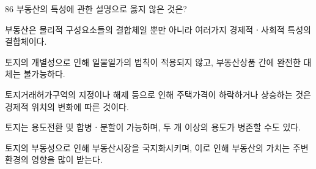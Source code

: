 \begin{question}{86}
부동산의 특성에 관한 설명으로 옳지 않은 것은?
\begin{choices}
  \item 부동산은 물리적 구성요소들의 결합체일 뿐만 아니라 여러가지 경제적ㆍ사회적 특성의 결합체이다.
  \item 토지의 개별성으로 인해 일물일가의 법칙이 적용되지 않고, 부동산상품 간에 완전한 대체는 불가능하다.
  \item 토지거래허가구역의 지정이나 해제 등으로 인해 주택가격이 하락하거나 상승하는 것은 경제적 위치의 변화에 따른 것이다.
  \item 토지는 용도전환 및 합병ㆍ분할이 가능하며, 두 개 이상의 용도가 병존할 수도 있다.
  \item 토지의 부동성으로 인해 부동산시장을 국지화시키며, 이로 인해 부동산의 가치는 주변 환경의 영향을 많이 받는다.
\end{choices}
\end{question}

